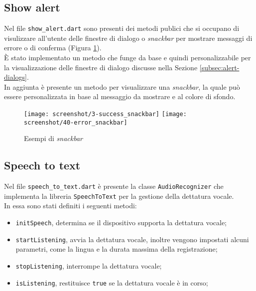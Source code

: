 \subsection{Show alert}
\label{subsec:show-alert}

Nel file \lstinline{show_alert.dart} sono presenti dei metodi publici che si occupano di visulizzare all'utente delle finestre di dialogo o \emph{snackbar} \cite{site:snackbar} per mostrare messaggi di errore o di conferma (Figura \ref{fig:snackbar}). \\
È stato implementato un metodo che funge da base e quindi personalizzabile per la visualizzazione delle finestre di dialogo discusse nella Sezione \ref{subsec:alert-dialogs}. \\
In aggiunta è presente un metodo per visualizzare una \emph{snackbar}, la quale può essere personalizzata in base al messaggio da mostrare e al colore di sfondo.

\begin{figure}[!h] 
    \centering 
    \texttt{[image: screenshot/3-success\_snackbar]} 
    \hfill
    \texttt{[image: screenshot/40-error\_snackbar]}
    \caption{Esempi di \emph{snackbar}}
    \label{fig:snackbar}
\end{figure}

\newpage

\subsection{Speech to text}
\label{subsec:speech-to-text}

Nel file \lstinline{speech_to_text.dart} è presente la classe \lstinline{AudioRecognizer} che implementa la libreria \lstinline{SpeechToText} \cite{site:speech-to-text} per la gestione della dettatura vocale. \\
In essa sono stati definiti i seguenti metodi:
\begin{itemize}
    \item \lstinline{initSpeech}, determina se il dispositivo supporta la dettatura vocale;
    \item \lstinline{startListening}, avvia la dettatura vocale, inoltre vengono impostati alcuni parametri, come la lingua e la durata massima della registrazione;
    \item \lstinline{stopListening}, interrompe la dettatura vocale;
    \item \lstinline{isListening}, restituisce \lstinline{true} se la dettatura vocale è in corso;
\end{itemize}

